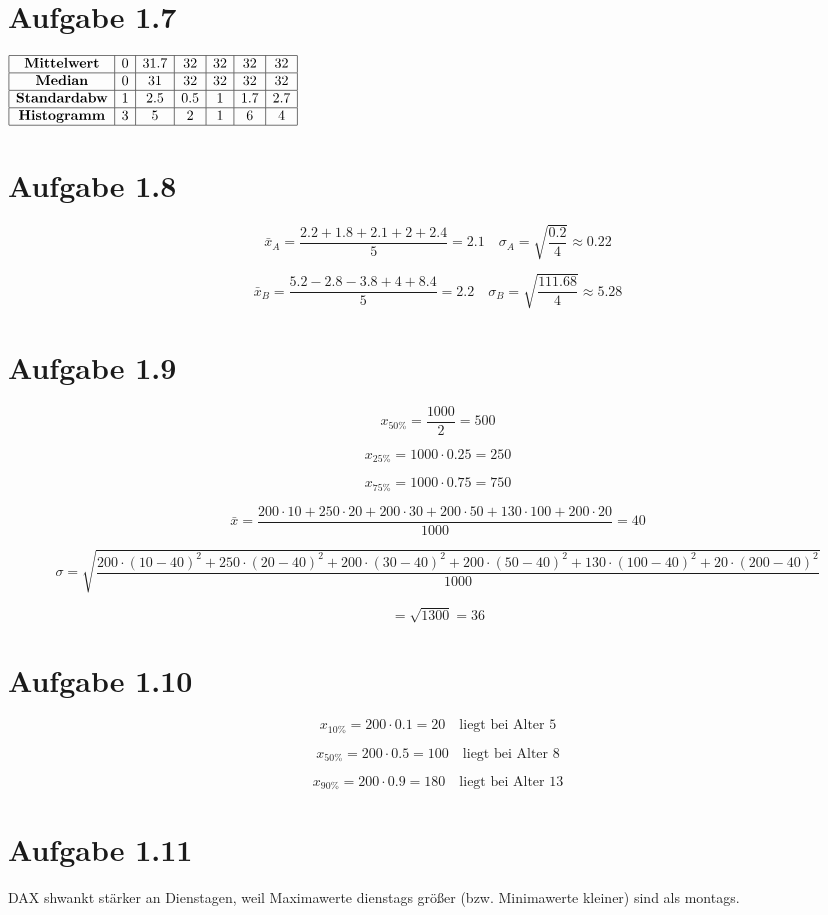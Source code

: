 \documentclass{article}
\begin{document}
 

		
		\section*{Aufgabe 1.7}
		
		\begin{center}
			\(
			\begin{array}{|c|c|c|c|c|c|c|}
				\hline
				\textbf{Mittelwert} & 0 & 31.7 & 32 & 32 & 32 & 32 \\
				\hline
				\textbf{Median} & 0 & 31 & 32 & 32 & 32 & 32  \\
				\hline
				\textbf{Standardabw} & 1 & 2.5 & 0.5 & 1 & 1.7 & 2.7 \\
				\hline
				\textbf{Histogramm} & 3 & 5 & 2 & 1 & 6 & 4 \\
				\hline
			\end{array}
			\)
		\end{center}
			
		\section*{Aufgabe 1.8}
		\[\bar{x}_{A}=\frac{2.2+1.8+2.1+2+2.4}{5}=2.1 \quad \sigma_{A}=\sqrt{\frac{0.2}{4}} \approx 0.22\]
		
		\[\bar{x}_{B}=\frac{5.2-2.8-3.8+4+8.4}{5}=2.2 \quad \sigma_{B}=\sqrt{\frac{111.68}{4}} \approx 5.28\]
		
			
		\section*{Aufgabe 1.9}
		\[x_{50\%}=\frac{1000}{2}=500\]
		
		\[x_{25\%}=1000 \cdot 0.25=250\]
		
		\[x_{75\%}=1000 \cdot 0.75=750\]
		
		\[\bar{x}=\frac{200 \cdot 10 + 250 \cdot 20 + 200 \cdot 30 + 200 \cdot 50 + 130 \cdot 100 + 200 \cdot 20}{1000} = 40\]
		
		\[\sigma=\sqrt{\frac{200 \cdot(10 - 40)^2 + 250 \cdot(20-40)^2+ 200 \cdot (30 -40)^2+ 200\cdot(50-40)^2+130\cdot (100-40)^2+20\cdot(200-40)^2}{1000}}\]
		
		\[=\sqrt{1300}=36\]
		
		\section*{Aufgabe 1.10}
		\[x_{10\%}=200\cdot0.1=20 \quad \text{liegt bei Alter 5}\] 
		
		\[x_{50\%}=200\cdot0.5=100 \quad \text{liegt bei Alter 8} \]
		
		\[x_{90\%}=200\cdot0.9=180 \quad \text{liegt bei Alter 13} \]
		
		\section*{Aufgabe 1.11}
		DAX shwankt stärker an Dienstagen, weil Maximawerte dienstags größer (bzw. Minimawerte kleiner) sind als montags.
	
\end{document}
